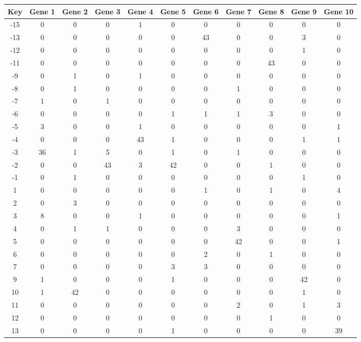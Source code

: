 \begin{tabular}{|c|c|c|c|c|c|c|c|c|c|c|}
\hline
Key & Gene 1 & Gene 2 & Gene 3 & Gene 4 & Gene 5 & Gene 6 & Gene 7 & Gene 8 & Gene 9 & Gene 10 \\
\hline
-15 & 0 & 0 & 0 & 1 & 0 & 0 & 0 & 0 & 0 & 0 \\
-13 & 0 & 0 & 0 & 0 & 0 & 43 & 0 & 0 & 3 & 0 \\
-12 & 0 & 0 & 0 & 0 & 0 & 0 & 0 & 0 & 1 & 0 \\
-11 & 0 & 0 & 0 & 0 & 0 & 0 & 0 & 43 & 0 & 0 \\
-9 & 0 & 1 & 0 & 1 & 0 & 0 & 0 & 0 & 0 & 0 \\
-8 & 0 & 1 & 0 & 0 & 0 & 0 & 1 & 0 & 0 & 0 \\
-7 & 1 & 0 & 1 & 0 & 0 & 0 & 0 & 0 & 0 & 0 \\
-6 & 0 & 0 & 0 & 0 & 1 & 1 & 1 & 3 & 0 & 0 \\
-5 & 3 & 0 & 0 & 1 & 0 & 0 & 0 & 0 & 0 & 1 \\
-4 & 0 & 0 & 0 & 43 & 1 & 0 & 0 & 0 & 1 & 1 \\
-3 & 36 & 1 & 5 & 0 & 1 & 0 & 1 & 0 & 0 & 0 \\
-2 & 0 & 0 & 43 & 3 & 42 & 0 & 0 & 1 & 0 & 0 \\
-1 & 0 & 1 & 0 & 0 & 0 & 0 & 0 & 0 & 1 & 0 \\
1 & 0 & 0 & 0 & 0 & 0 & 1 & 0 & 1 & 0 & 4 \\
2 & 0 & 3 & 0 & 0 & 0 & 0 & 0 & 0 & 0 & 0 \\
3 & 8 & 0 & 0 & 1 & 0 & 0 & 0 & 0 & 0 & 1 \\
4 & 0 & 1 & 1 & 0 & 0 & 0 & 3 & 0 & 0 & 0 \\
5 & 0 & 0 & 0 & 0 & 0 & 0 & 42 & 0 & 0 & 1 \\
6 & 0 & 0 & 0 & 0 & 0 & 2 & 0 & 1 & 0 & 0 \\
7 & 0 & 0 & 0 & 0 & 3 & 3 & 0 & 0 & 0 & 0 \\
9 & 1 & 0 & 0 & 0 & 1 & 0 & 0 & 0 & 42 & 0 \\
10 & 1 & 42 & 0 & 0 & 0 & 0 & 0 & 0 & 1 & 0 \\
11 & 0 & 0 & 0 & 0 & 0 & 0 & 2 & 0 & 1 & 3 \\
12 & 0 & 0 & 0 & 0 & 0 & 0 & 0 & 1 & 0 & 0 \\
13 & 0 & 0 & 0 & 0 & 1 & 0 & 0 & 0 & 0 & 39 \\
\hline
\end{tabular}